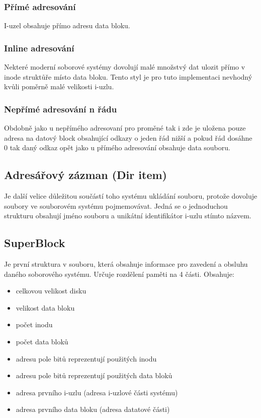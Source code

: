 \documentclass[12pt, a4paper]{report}
\begin{document}
\subsubsection{Přímé adresování}
I-uzel obsahuje přímo adresu data bloku.
\subsubsection{Inline adresování}
Nekteré moderní soborové systémy dovolují malé množstvý dat ulozit přímo v inode struktůře místo data bloku. Tento styl je pro tuto implementaci nevhodný kvůli poměrně malé velikosti i-uzlu.
\subsubsection{Nepřímé adresování n řádu}
Obdobně jako u nepřímého adresovaní pro proměné tak i zde je uložena pouze adresa na datový block obsahující odkazy o jeden řád nižší a pokud řád dosáhne 0 tak daný odkaz opět jako u přímého adresování obsahuje data souboru.
\subsection{Adresářový zázman (Dir item)}
Je další velice důležitou součástí toho systému ukládání souboru, protože dovoluje soubory ve souborovém systému pojmemovávat. Jedná se o jednoduchou strukturu obsahují jméno souboru a unikátní identifikátor i-uzlu stímto názvem.
\subsection{SuperBlock}
Je první struktura v souboru, která obsahuje informace pro zavedení a obsluhu daného soborového systému. Určuje rozdělení paměti na 4 části.
\linebreak
Obsahuje:
\begin{itemize}
 \item celkovou velikost disku
 \item velikost data bloku
 \item počet inodu
 \item počet data bloků
 \item adresu pole bitů reprezentují použitých inodu
 \item adresu pole bitů reprezentují použitých data bloků
 \item adresa prvního i-uzlu (adresa i-uzlové části systému)
 \item adresa prvního data bloku (adresa datatové části)
\end{itemize}
\end{document}
